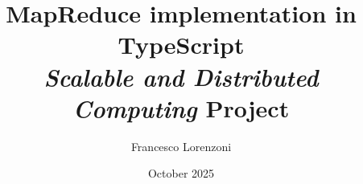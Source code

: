 


\lstset{language=JavaScript}



\lstset{
  language=JavaScript
}

\let\oldverb\verb

\makeatletter
\def\verb{\@ifnextchar|{\verb@colored}{\oldverb}}
\def\verb@colored|#1|{\colorbox{mybg}{\footnotesize\ttfamily\color{mytext}\detokenize{#1}}}
\makeatother

\title{MapReduce implementation in TypeScript \\{\large \textit{Scalable and Distributed Computing} Project}}
\author{Francesco Lorenzoni}
\date{October 2025}



\maketitle
\tableofcontents



